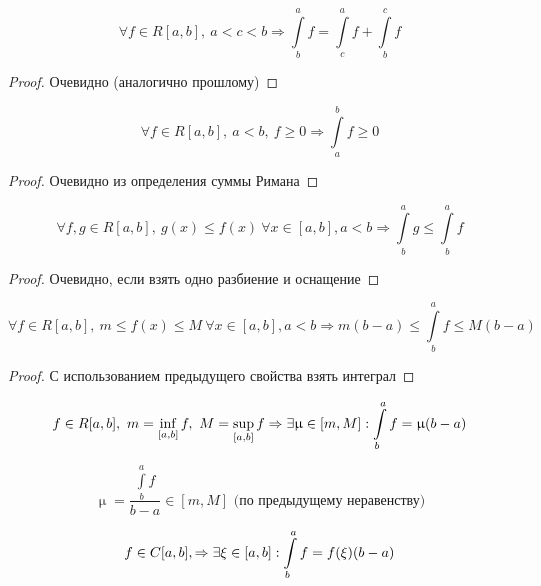 \documentclass[matan]{subfiles}
\begin{document}
  \begin{Property}[2, аддитивность]
      \[\forall f \in R[a,b],\ a<c<b \Rightarrow \int\limits^a_b f = \int\limits^a_c f + \int\limits^c_b f\]
  \end{Property}

  \begin{proof}
  Очевидно (аналогично прошлому)
  \end{proof}

  \begin{Property}[3]
      \[\forall f \in R[a,b],\ a<b,\ f \geqslant 0 \Rightarrow \int\limits_a^b f \geqslant 0\]
  \end{Property}

  \begin{proof}
      Очевидно из определения суммы Римана
  \end{proof}

  \begin{Property}[4]
      \[\forall f,g \in R[a,b],\ g(x) \leqslant f(x)\ \forall x \in [a,b], a<b \Rightarrow \int\limits^a_b g \leqslant \int\limits^a_b f\]
  \end{Property}

  \begin{proof}
      Очевидно, если взять одно разбиение и оснащение
  \end{proof}

  \begin{Property}[5]
      \[\forall f \in R[a,b],\ m \leqslant f(x) \leqslant M\ \forall x \in [a,b], a<b \Rightarrow m(b-a) \leqslant \int\limits^a_b f \leqslant M(b-a)\]
  \end{Property}

  \begin{proof}
      С использованием предыдущего свойства взять интеграл
  \end{proof}

  \begin{Property}[6]
      \[f \in R[a,b],\ m = \inf\limits_{[a,b]} f,\ M = \sup\limits_{[a,b]} f \Rightarrow \exists \upmu \in [m,M]: \int\limits^a_b f =\upmu (b-a)\]
  \end{Property}

  \begin{Proof}
      \[\upmu=\frac{\int\limits^a_b f}{b-a} \in [m,M] \text{ (по предыдущему неравенству)}\]
  \end{Proof}

  \begin{Property}[7]
      \[f \in C[a,b], \Rightarrow \exists \xi \in [a,b]: \int\limits^a_b f = f(\xi) (b-a)\]
  \end{Property}
\end{document}
